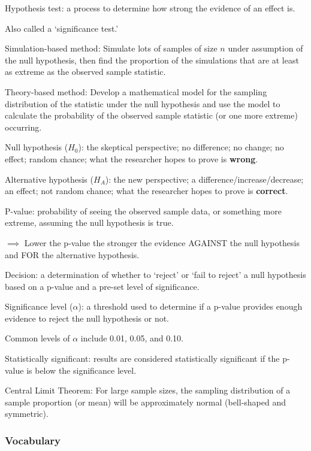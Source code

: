 \documentclass[
]{report}
\newcommand{\rgi}{\hspace{24pt}}  %
\begin{document}
Hypothesis test: a process to determine how strong the evidence of an effect is.

\rgi Also called a `significance test.'

Simulation-based method: Simulate lots of samples of size \(n\) under assumption of the null hypothesis, then find the proportion of the simulations that are at least as extreme as the observed sample statistic.

Theory-based method: Develop a mathematical model for the sampling distribution of the statistic under the null hypothesis and use the model to calculate the probability of the observed sample statistic (or one more extreme) occurring.

Null hypothesis (\(H_0\)): the skeptical perspective; no difference; no change; no effect; random chance; what the researcher hopes to prove is \textbf{wrong}.

Alternative hypothesis (\(H_A\)): the new perspective; a difference/increase/decrease; an effect; not random chance; what the researcher hopes to prove is \textbf{correct}.

P-value: probability of seeing the observed sample data, or something more extreme, assuming the null hypothesis is true.

\(\implies\) Lower the p-value the stronger the evidence AGAINST the null hypothesis and FOR the alternative hypothesis.

Decision: a determination of whether to `reject' or `fail to reject' a null hypothesis based on a p-value and a pre-set level of significance.

Significance level (\(\alpha\)): a threshold used to determine if a p-value provides enough evidence to reject the null hypothesis or not.

\rgi Common levels of \(\alpha\) include 0.01, 0.05, and 0.10.

Statistically significant: results are considered statistically significant if the p-value is below the significance level.

Central Limit Theorem: For large sample sizes, the sampling distribution of a sample proportion (or mean) will be approximately normal (bell-shaped and symmetric).

\hypertarget{vocabulary-12}{%
\subsubsection*{Vocabulary}\label{vocabulary-12}}
\end{document}
